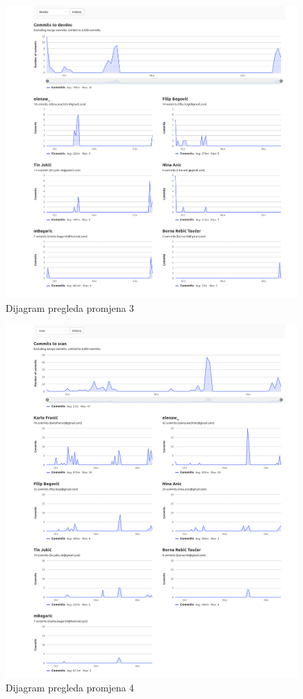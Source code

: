 		\begin{figure}[H]
			\centering
			\includegraphics[width=1.0\linewidth]{"slike/contributors_devdoc"}
			\caption{Dijagram pregleda promjena 3}
			\label{Slika 6.3}
		\end{figure}
	
		\begin{figure}[H]
			\centering
			\includegraphics[width=1.0\linewidth]{"slike/contributors_scan"}
			\caption{Dijagram pregleda promjena 4}
			\label{Slika 6.4}
		\end{figure}
	
